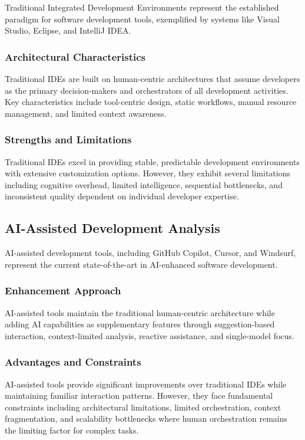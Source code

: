 Traditional Integrated Development Environments represent the established paradigm for software development tools, exemplified by systems like Visual Studio, Eclipse, and IntelliJ IDEA.

\subsubsection{Architectural Characteristics}

Traditional IDEs are built on human-centric architectures that assume developers as the primary decision-makers and orchestrators of all development activities. Key characteristics include tool-centric design, static workflows, manual resource management, and limited context awareness.

\subsubsection{Strengths and Limitations}

Traditional IDEs excel in providing stable, predictable development environments with extensive customization options. However, they exhibit several limitations including cognitive overhead, limited intelligence, sequential bottlenecks, and inconsistent quality dependent on individual developer expertise.

\subsection{AI-Assisted Development Analysis}

AI-assisted development tools, including GitHub Copilot, Cursor, and Windsurf, represent the current state-of-the-art in AI-enhanced software development.

\subsubsection{Enhancement Approach}

AI-assisted tools maintain the traditional human-centric architecture while adding AI capabilities as supplementary features through suggestion-based interaction, context-limited analysis, reactive assistance, and single-model focus.

\subsubsection{Advantages and Constraints}

AI-assisted tools provide significant improvements over traditional IDEs while maintaining familiar interaction patterns. However, they face fundamental constraints including architectural limitations, limited orchestration, context fragmentation, and scalability bottlenecks where human orchestration remains the limiting factor for complex tasks.

